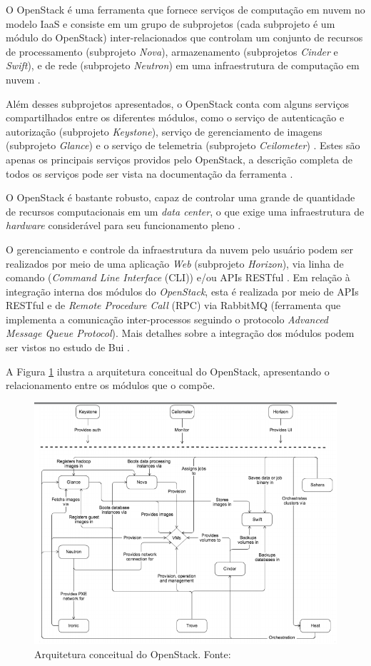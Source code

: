 \documentclass[conference]{IEEEtran}
\begin{document}
O OpenStack é uma ferramenta que fornece serviços de computação em nuvem no modelo IaaS e consiste em um grupo de subprojetos (cada subprojeto é um módulo 
do OpenStack) inter-relacionados 
que controlam um conjunto de recursos de processamento (subprojeto \textit{Nova}), armazenamento (subprojetos \textit{Cinder} e \textit{Swift}),
e de rede (subprojeto \textit{Neutron}) em uma infraestrutura de computação em nuvem \cite{openstack} \cite{bui2016}.

Além desses subprojetos apresentados, o OpenStack conta com alguns serviços compartilhados entre os diferentes módulos, como o serviço de 
autenticação e autorização (subprojeto \textit{Keystone}), serviço de gerenciamento de imagens (subprojeto \textit{Glance}) e o serviço de 
telemetria (subprojeto \textit{Ceilometer}) \cite{openstack}. Estes são apenas os principais serviços providos pelo OpenStack, a
descrição completa de todos os serviços pode ser vista na documentação da ferramenta \cite{openstack}.

O OpenStack é bastante robusto, capaz de controlar uma grande de quantidade
de recursos computacionais em um \textit{data center}, o que exige uma infraestrutura de \textit{hardware} 
considerável para seu funcionamento pleno \cite{openstack_general} \cite{openstack}.

O gerenciamento e controle da infraestrutura da nuvem pelo usuário podem ser realizados por meio de uma aplicação \textit{Web}
(subprojeto \textit{Horizon}), via linha de comando (\textit{Command Line Interface} (CLI)) e/ou APIs RESTful \cite{bui2016} \cite{openstack}.
Em relação à integração interna dos módulos do \textit{OpenStack}, esta é realizada por meio de APIs RESTful e 
de \textit{Remote Procedure Call} (RPC) via RabbitMQ (ferramenta que implementa a comunicação inter-processos seguindo o protocolo
\textit{Advanced Message Queue Protocol})\cite{bui2016}. Mais detalhes sobre a integração dos módulos podem ser vistos no estudo de Bui \cite{bui2016}.

A Figura \ref{fig:openstack_architecture} ilustra a arquitetura conceitual do OpenStack, apresentando o relacionamento entre os
módulos que o compõe.

\begin{figure}[ht]
\centering
\includegraphics[width=.5\textwidth]{figuras/openstack_architecture.png}
\caption{Arquitetura conceitual do OpenStack. Fonte: \cite{openstack}}
\label{fig:openstack_architecture}
\end{figure}
\end{document}
